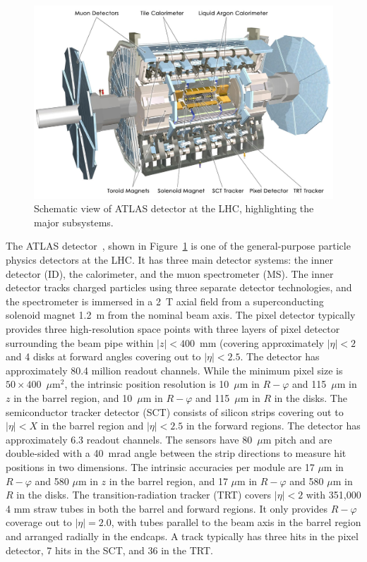 \begin{figure}[!t]
\begin{center}
\includegraphics[height=0.49\textwidth]{introduction_figs/0803012_05-A4-at-144-dpi.jpg}
\caption[]{Schematic view of ATLAS detector at the LHC, highlighting the major subsystems.}
\label{fig:pas:intro:atlas}
\end{center}
\end{figure}

The ATLAS detector~\cite{Aad:2008zzm}, shown in Figure~\ref{fig:pas:intro:atlas} is one of the general-purpose particle physics
detectors at the LHC.
It has three main detector systems: the inner detector (ID), the calorimeter,
and the muon spectrometer (MS).
%
The inner detector tracks charged particles using three separate detector
technologies, and the spectrometer is immersed in a 2~T axial field from a
superconducting solenoid magnet 1.2~m from the nominal beam axis.
The pixel detector typically provides three high-resolution space points
with three layers of pixel detector surrounding the beam pipe within
$|z|<400$~mm (covering approximately $|\eta|<2$ and 4 disks at forward
angles covering out to $|\eta|<2.5$.
The detector has approximately 80.4 million readout channels.
While the minimum pixel size is $50 \times 400$~$\mu$m$^2$, the intrinsic
position resolution is 10~$\mu\mathrm{m}$ in $R-\varphi$ and 115~$\mu\mathrm{m}$ in $z$
in the barrel region, and 10~$\mu\mathrm{m}$ in $R-\varphi$ and 115~$\mu\mathrm{m}$ in $R$
in the disks.
The semiconductor tracker detector (SCT) consists of silicon strips covering out to
$|\eta|<X$ in the barrel region and $|\eta|<2.5$ in the forward regions.
The detector has approximately 6.3 readout channels.
The sensors have 80~$\mu$m pitch and are
double-sided with a 40~mrad angle between the strip
directions to measure hit positions in two dimensions.
The intrinsic accuracies per module are
17 $\mu\mathrm{m}$ in $R-\varphi$ and 580  $\mu\mathrm{m}$ in $z$
in the barrel region, and 17 $\mu\mathrm{m}$ in $R-\varphi$ and 580  $\mu\mathrm{m}$ in $R$
in the disks.
The transition-radiation tracker (TRT) covers $|\eta|<2$ with 351,000 4 mm straw tubes in
both the barrel and forward regions.
It only provides $R-\varphi$ coverage out to $|\eta|=2.0$, with tubes parallel to the beam
axis in the barrel region and arranged radially in the endcaps.
A track typically has three hits in the pixel detector, 7 hits in the SCT, and 36 in the
TRT.

